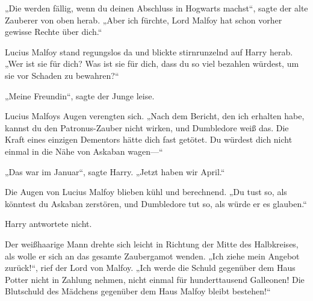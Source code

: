 „Die werden fällig, wenn du deinen Abschluss in Hogwarts machst“, sagte der alte Zauberer von oben herab. „Aber ich fürchte, Lord Malfoy hat schon vorher gewisse Rechte über dich.“

Lucius Malfoy stand regungslos da und blickte stirnrunzelnd auf Harry herab.
„Wer ist sie für dich? Was ist sie für dich, dass du so viel bezahlen würdest, um sie vor Schaden zu bewahren?“

„Meine Freundin“, sagte der Junge leise.

Lucius Malfoys Augen verengten sich.
„Nach dem Bericht, den ich erhalten habe, kannst du den Patronus-Zauber nicht wirken, und Dumbledore weiß das. Die Kraft eines einzigen Dementors hätte dich fast getötet. Du würdest dich nicht einmal in die Nähe von Askaban wagen—“

„Das war im Januar“, sagte Harry. „Jetzt haben wir April.“

Die Augen von Lucius Malfoy blieben kühl und berechnend.
„Du tust so, als könntest du Askaban zerstören, und Dumbledore tut so, als würde er es glauben.“

Harry antwortete nicht.

Der weißhaarige Mann drehte sich leicht in Richtung der Mitte des Halbkreises, als wolle er sich an das gesamte Zaubergamot wenden.
„Ich ziehe mein Angebot zurück!“, rief der Lord von Malfoy. „Ich werde die Schuld gegenüber dem Haus Potter nicht in Zahlung nehmen, nicht einmal für hunderttausend Galleonen! Die Blutschuld des Mädchens gegenüber dem Haus Malfoy bleibt bestehen!“

